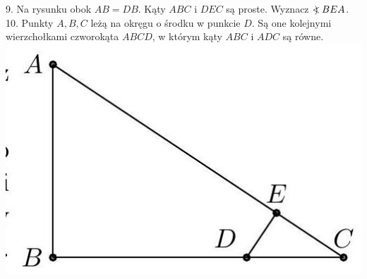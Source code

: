 \documentclass[10pt]{article}
\newcommand\Varangle{\mathop{{<\!\!\!\!\!\text{\small)}}\:}\nolimits}
\begin{document}
9. Na rysunku obok \(A B=D B\). Kąty \(A B C\) i \(D E C\) są proste. Wyznacz \(\Varangle B E A\).\\
10. Punkty \(A, B, C\) leżą na okręgu o środku w punkcie \(D\). Są one kolejnymi wierzchołkami czworokąta \(A B C D\), w którym kąty \(A B C\) i \(A D C\) są równe.\\
\includegraphics[max width=\textwidth, center]{2024_11_21_71f62bd117d375398909g-200}
\end{document}
